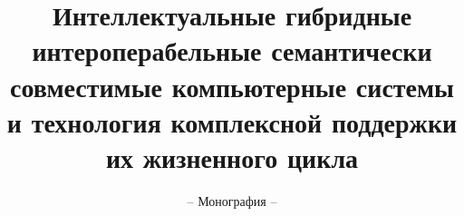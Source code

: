 \documentclass[graybox,envcountchap,sectrefs]{svmono}
\begin{document}
\author{}
\title{Интеллектуальные гибридные интероперабельные семантически совместимые компьютерные системы и технология комплексной поддержки их жизненного цикла}
\subtitle{-- Монография --}
\maketitle

\frontmatter%



\tableofcontents



\mainmatter%









\backmatter%

\printindex


\end{document}
